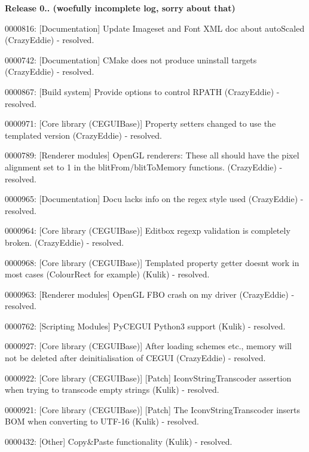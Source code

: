 {\bfseries{Release 0.. (woefully incomplete log, sorry about that)}}
\begin{DoxyItemize}
\item 0000816\+: \mbox{[}Documentation\mbox{]} Update Imageset and Font X\+ML doc about auto\+Scaled (Crazy\+Eddie) -\/ resolved.
\item 0000742\+: \mbox{[}Documentation\mbox{]} C\+Make does not produce uninstall targets (Crazy\+Eddie) -\/ resolved.
\item 0000867\+: \mbox{[}Build system\mbox{]} Provide options to control R\+P\+A\+TH (Crazy\+Eddie) -\/ resolved.
\item 0000971\+: \mbox{[}Core library (C\+E\+G\+U\+I\+Base)\mbox{]} Property setters changed to use the templated version (Crazy\+Eddie) -\/ resolved.
\item 0000789\+: \mbox{[}Renderer modules\mbox{]} Open\+GL renderers\+: These all should have the pixel alignment set to 1 in the blit\+From/blit\+To\+Memory functions. (Crazy\+Eddie) -\/ resolved.
\item 0000965\+: \mbox{[}Documentation\mbox{]} Docu lacks info on the regex style used (Crazy\+Eddie) -\/ resolved.
\item 0000964\+: \mbox{[}Core library (C\+E\+G\+U\+I\+Base)\mbox{]} Editbox regexp validation is completely broken. (Crazy\+Eddie) -\/ resolved.
\item 0000968\+: \mbox{[}Core library (C\+E\+G\+U\+I\+Base)\mbox{]} Templated property getter doesnt work in most cases (Colour\+Rect for example) (Kulik) -\/ resolved.
\item 0000963\+: \mbox{[}Renderer modules\mbox{]} Open\+GL F\+BO crash on my driver (Crazy\+Eddie) -\/ resolved.
\item 0000762\+: \mbox{[}Scripting Modules\mbox{]} Py\+C\+E\+G\+UI Python3 support (Kulik) -\/ resolved.
\item 0000927\+: \mbox{[}Core library (C\+E\+G\+U\+I\+Base)\mbox{]} After loading schemes etc., memory will not be deleted after deinitialisation of C\+E\+G\+UI (Crazy\+Eddie) -\/ resolved.
\item 0000922\+: \mbox{[}Core library (C\+E\+G\+U\+I\+Base)\mbox{]} \mbox{[}Patch\mbox{]} Iconv\+String\+Transcoder assertion when trying to transcode empty strings (Kulik) -\/ resolved.
\item 0000921\+: \mbox{[}Core library (C\+E\+G\+U\+I\+Base)\mbox{]} \mbox{[}Patch\mbox{]} The Iconv\+String\+Transcoder inserts B\+OM when converting to U\+T\+F-\/16 (Kulik) -\/ resolved.
\item 0000432\+: \mbox{[}Other\mbox{]} Copy\&Paste functionality (Kulik) -\/ resolved.

\end{DoxyItemize}
